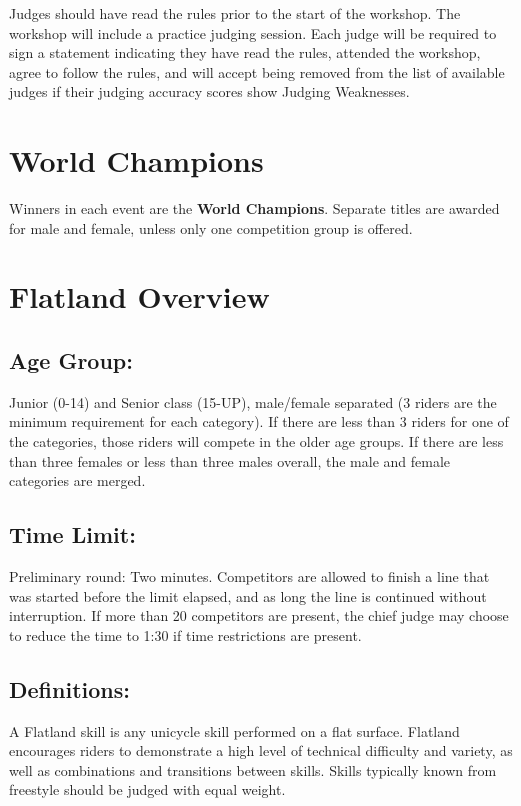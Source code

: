 Judges should have read the rules prior to the start of the workshop.
The workshop will include a practice judging session.
Each judge will be required to sign a statement indicating they have read the rules, attended the workshop, agree to follow the rules, and will accept being removed from the list of available judges if their judging accuracy scores show Judging Weaknesses.

\section{World Champions}
Winners in each event are the \textbf{World Champions}. Separate titles are awarded for male and female, unless only one competition group is offered.

\section{Flatland Overview}

\subsection{Age Group:}
Junior (0-14) and Senior class (15-UP), male/female separated (3 riders are the minimum requirement for each category).
If there are less than 3 riders for one of the categories, those riders will compete in the older age groups.
If there are less than three females or less than three males overall, the male and female categories are merged.

\subsection{Time Limit:}
Preliminary round: Two minutes.
Competitors are allowed to finish a line that was started before the limit elapsed, and as long the line is continued without interruption.
If more than 20 competitors are present, the chief judge may choose to reduce the time to 1:30 if time restrictions are present.

\subsection{Definitions:}
A Flatland skill is any unicycle skill performed on a flat surface.
Flatland encourages riders to demonstrate a high level of technical difficulty and variety, as well as combinations and transitions between skills.
Skills typically known from freestyle should be judged with equal weight.


